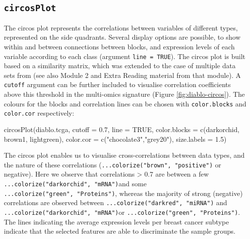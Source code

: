 \documentclass[
]{book}
\newenvironment{Shaded}{\begin{snugshade}}{\end{snugshade}}
\newcommand{\AttributeTok}[1]{\textcolor[rgb]{0.77,0.63,0.00}{#1}}
\newcommand{\ConstantTok}[1]{\textcolor[rgb]{0.00,0.00,0.00}{#1}}
\newcommand{\FloatTok}[1]{\textcolor[rgb]{0.00,0.00,0.81}{#1}}
\newcommand{\FunctionTok}[1]{\textcolor[rgb]{0.00,0.00,0.00}{#1}}
\newcommand{\NormalTok}[1]{#1}
\newcommand{\StringTok}[1]{\textcolor[rgb]{0.31,0.60,0.02}{#1}}
\begin{document}
\hypertarget{circosplot}{%
\subsection{\texorpdfstring{\texttt{circosPlot}}{circosPlot}}\label{circosplot}}

The circos plot represents the correlations between variables of different types, represented on the side quadrants. Several display options are possible, to show within and between connections between blocks, and expression levels of each variable according to each class (argument \texttt{line\ =\ TRUE}). The circos plot is built based on a similarity matrix, which was extended to the case of multiple data sets from \citet{Gon12} (see also Module 2 and Extra Reading material from that module). A \texttt{cutoff} argument can be further included to visualise correlation coefficients above this threshold in the multi-omics signature (Figure \ref{fig:diablo-circos}). The colours for the blocks and correlation lines can be chosen with \texttt{color.blocks} and \texttt{color.cor} respectively:

\begin{Shaded}
\begin{Highlighting}[]
\FunctionTok{circosPlot}\NormalTok{(diablo.tcga, }\AttributeTok{cutoff =} \FloatTok{0.7}\NormalTok{, }\AttributeTok{line =} \ConstantTok{TRUE}\NormalTok{, }
           \AttributeTok{color.blocks =} \FunctionTok{c}\NormalTok{(}\StringTok{\textquotesingle{}darkorchid\textquotesingle{}}\NormalTok{, }\StringTok{\textquotesingle{}brown1\textquotesingle{}}\NormalTok{, }\StringTok{\textquotesingle{}lightgreen\textquotesingle{}}\NormalTok{),}
           \AttributeTok{color.cor =} \FunctionTok{c}\NormalTok{(}\StringTok{"chocolate3"}\NormalTok{,}\StringTok{"grey20"}\NormalTok{), }\AttributeTok{size.labels =} \FloatTok{1.5}\NormalTok{)}
\end{Highlighting}
\end{Shaded}



The circos plot enables us to visualise cross-correlations between data types, and the nature of these correlations (\texttt{...colorize("brown",\ "positive")} or negative). Here we observe that correlations \textgreater{} 0.7 are between a few \texttt{...colorize("darkorchid",\ "mRNA")}and some \texttt{...colorize("green",\ "Proteins")}, whereas the majority of strong (negative) correlations are observed between \texttt{...colorize("darkred",\ "miRNA")} and \texttt{...colorize("darkorchid",\ "mRNA")}or \texttt{...colorize("green",\ "Proteins")}. The lines indicating the average expression levels per breast cancer subtype indicate that the selected features are able to discriminate the sample groups.
\end{document}
